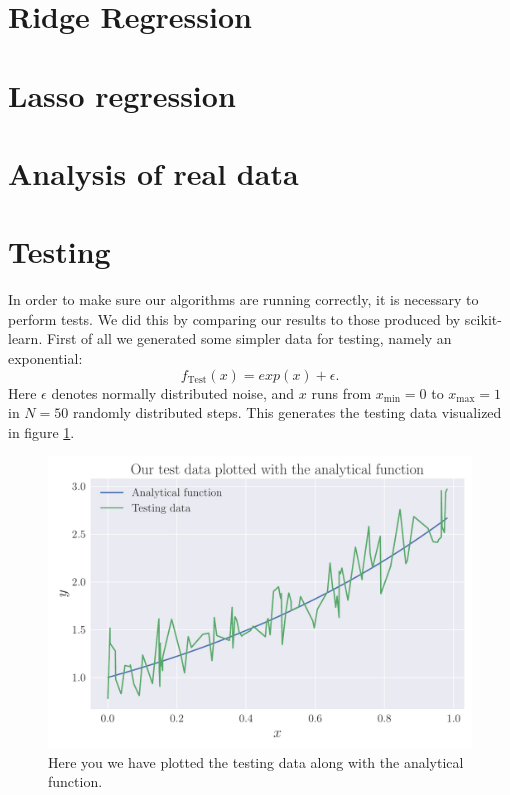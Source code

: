 \documentclass[reprint,english,notitlepage,aps,nobalancelastpage,nofootinbib]{revtex4-1}  %
\begin{document}
\section{Ridge Regression}


\section{Lasso regression}


\section{Analysis of real data}

\section{Testing}
In order to make sure our algorithms are running correctly, it is necessary to perform tests. We did this by comparing our results to those produced by scikit-learn. First of all we generated some simpler data for testing, namely an exponential:
\begin{equation}
	\label{eq:exp}
	f_\text{Test}(x) = exp(x) + \epsilon.
\end{equation}
Here $\epsilon$ denotes normally distributed noise, and $x$ runs from $x_\text{min} = 0$ to $x_\text{max} = 1$ in $N = 50$ randomly distributed steps. This generates the testing data visualized in figure \ref{fig:TestingData}.

\begin{figure}[!htb]
	\includegraphics[width=\linewidth]{Testing_data.pdf}
	\caption{Here you we have plotted the testing data along with the analytical function.}
	\label{fig:TestingData}
\end{figure}
\end{document}
